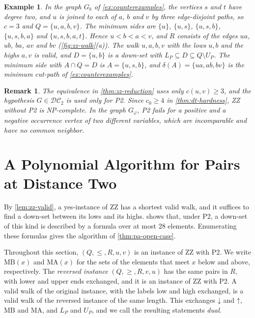 \documentclass[pdflatex,sn-mathphys-num]{sn-jnl}%
\theoremstyle{thmstyleone}%
\theoremstyle{thmstyletwo}%
\newtheorem{example}{Example}%
\newtheorem{remark}{Remark}%
\theoremstyle{thmstylethree}%
\newcommand{\DC}{\mathcal{DC}_2}%
\newcommand{\dn}{\mathord{\downarrow}}%
\newcommand{\upp}{\mathord{\uparrow}}%
\newcommand{\MB}{\mathrm{MB}}%
\newcommand{\MA}{\mathrm{MA}}%
\begin{document}
\begin{example}
\label{ex:zz-instance}
In the graph $G_b$ of \cref{ex:counterexamples}, the vertices $s$ and $t$ have degree two, and $u$ is joined to each of $a$, $b$ and $v$ by three edge-disjoint paths, so $c = 3$ and $Q = \{u, a, b, v\}$.
The minimum sides are $\{u\}$, $\{u, s\}$, $\{u, s, b\}$, $\{u, s, b, a\}$ and $\{u, s, b, a, t\}$.
Hence $u < b < a < v$, and $R$ consists of the edges $ua$, $ub$, $ba$, $av$ and $bv$ (\cref{fig:zz-walk}(a)).
The walk $u, a, b, v$ with the lows $u, b$ and the highs $a, v$ is valid, and $D = \{u, b\}$ is a down-set with $L_P \subseteq D \subseteq Q \setminus U_P$.
The minimum side with $A \cap Q = D$ is $A = \{u, s, b\}$, and $\delta(A) = \{ua, ab, bv\}$ is the minimum cut-path of \cref{ex:counterexamples}.
\end{example}

\begin{remark}
\label{rem:zz-no-p2}
The equivalence in \cref{thm:zz-reduction} uses only $c(u, v) \geq 3$, and the hypothesis $G \in \DC$ is used only for P2.
Since $c_0 \geq 4$ in \cref{thm:dt-hardness}, ZZ without P2 is NP-complete.
In the graph $G_\varphi$, P2 fails for a positive and a negative occurrence vertex of two different variables, which are incomparable and have no common neighbor.
\end{remark}

\section{A Polynomial Algorithm for Pairs at Distance Two}
\label{sec:pa-polynomial}

By \cref{lem:zz-valid}, a yes-instance of ZZ has a shortest valid walk, and it suffices to find a down-set between its lows and its highs.
 shows that, under P2, a down-set of this kind is described by a formula over at most 28 elements.
Enumerating these formulas gives the algorithm of \cref{thm:pa-open-case}.

Throughout this section, $(Q, \leq, R, u, v)$ is an instance of ZZ with P2.
We write $\MB(x)$ and $\MA(x)$ for the sets of the elements that meet $x$ below and above, respectively.
The \emph{reversed instance} $(Q, \geq, R, v, u)$ has the same pairs in $R$, with lower and upper ends exchanged, and it is an instance of ZZ with P2.
A valid walk of the original instance, with the labels low and high exchanged, is a valid walk of the reversed instance of the same length.
This exchanges $\dn$ and $\upp$, $\MB$ and $\MA$, and $L_P$ and $U_P$, and we call the resulting statements \emph{dual}.
\end{document}
